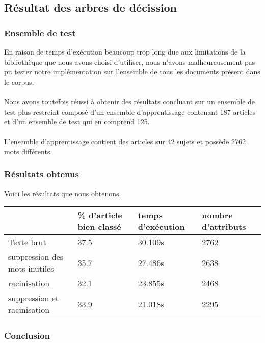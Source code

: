 \subsection{Résultat des arbres de décission}

\subsubsection{Ensemble de test}

En raison de temps d'exécution beaucoup trop long due aux limitations de la bibliothèque que nous avons choisi d'utiliser, nous n’avons malheureusement pas pu tester notre implémentation sur l’ensemble de tous les documents présent dans le corpus.
\paragraph{}
Nous avons toutefois réussi à obtenir des résultats concluant sur un ensemble de test plus restreint composé d’un ensemble d’apprentissage contenant 187 articles et d’un ensemble de test qui en comprend 125.
\paragraph{}
L’ensemble d’apprentissage contient des articles sur 42 sujets et possède 2762 mots différents.

\subsubsection{Résultats obtenus}

Voici les résultats que nous obtenons.

\begin{center}
    \begin{tabular}{| l | p{2cm} | p{2cm} | p{2cm} |}
    \hline
    & \% d'article bien classé & temps d'exécution & nombre d'attributs \\ \hline
    Texte brut & 37.5 & 30.109s & 2762 \\ \hline
    suppression des mots inutiles & 35.7 & 27.486s & 2638 \\ \hline
	racinisation & 32.1 & 23.855s & 2468 \\ \hline
    suppression et racinisation & 33.9 & 21.018s & 2295 \\
    \hline
    \end{tabular}
\end{center}

\subsubsection{Conclusion}

